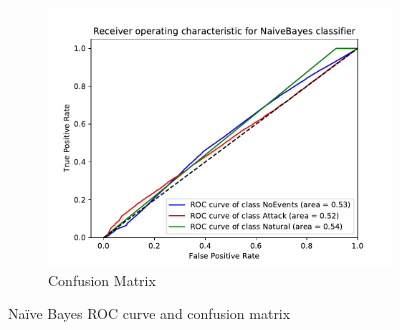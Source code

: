\begin{figure}[H]
\begin{subfigure}[t]{0.3\textwidth}
        \includegraphics[page=2, width=\linewidth, trim= 0 50 0 100, clip]{images/results_scikit/NaiveBayes}
        \caption{Confusion Matrix}
        \label{fig:scikit_NB_CM}
    \end{subfigure}
    \caption{Naïve Bayes ROC curve and confusion matrix}
    \label{fig:ROCCM_NB}
\end{figure}

